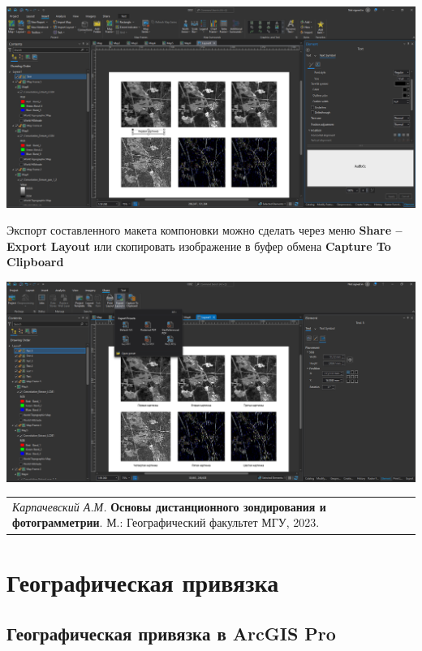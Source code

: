 \documentclass[
  12pt,
]{book}
\begin{document}
\includegraphics{images/Ref01/Graphic_Elements.png}

Экспорт составленного макета компоновки можно сделать через меню \textbf{Share -- Export Layout} или скопировать изображение в буфер обмена \textbf{Capture To Clipboard}

\includegraphics{images/Ref01/Export.png}

\begin{longtable}[]{@{}l@{}}
\toprule\noalign{}
\endhead
\bottomrule\noalign{}
\endlastfoot
\emph{Карпачевский А.М.} \textbf{Основы дистанционного зондирования и фотограмметрии}. М.: Географический факультет МГУ, 2023. \\
\end{longtable}

\hypertarget{georeference}{%
\chapter{Географическая привязка}\label{georeference}}

\hypertarget{georeference-arcgis}{%
\section{Географическая привязка в ArcGIS Pro}\label{georeference-arcgis}}
\end{document}

